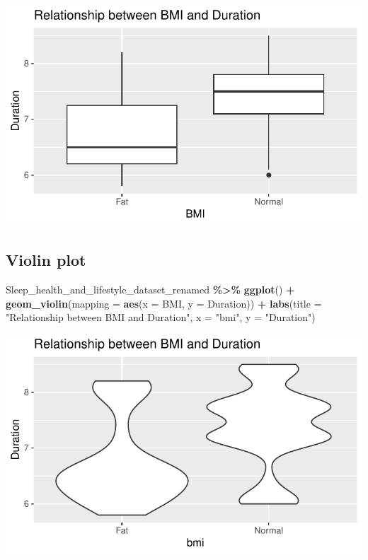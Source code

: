 \documentclass[
  11pt,
]{article}
\newenvironment{Shaded}{\begin{snugshade}}{\end{snugshade}}
\newcommand{\AttributeTok}[1]{\textcolor[rgb]{0.13,0.29,0.53}{#1}}
\newcommand{\FunctionTok}[1]{\textcolor[rgb]{0.13,0.29,0.53}{\textbf{#1}}}
\newcommand{\NormalTok}[1]{#1}
\newcommand{\SpecialCharTok}[1]{\textcolor[rgb]{0.81,0.36,0.00}{\textbf{#1}}}
\newcommand{\StringTok}[1]{\textcolor[rgb]{0.31,0.60,0.02}{#1}}
\begin{document}
\begin{center}\includegraphics[width=0.7\linewidth]{SleepHelath_files/figure-latex/unnamed-chunk-44-1} \end{center}

\hypertarget{violin-plot-1}{%
\subsection{Violin plot}\label{violin-plot-1}}

\begin{Shaded}
\begin{Highlighting}[]
\NormalTok{Sleep\_health\_and\_lifestyle\_dataset\_renamed }\SpecialCharTok{\%\textgreater{}\%}
  \FunctionTok{ggplot}\NormalTok{() }\SpecialCharTok{+}
    \FunctionTok{geom\_violin}\NormalTok{(}\AttributeTok{mapping =} \FunctionTok{aes}\NormalTok{(}\AttributeTok{x =}\NormalTok{ BMI, }\AttributeTok{y =}\NormalTok{ Duration)) }\SpecialCharTok{+}
    \FunctionTok{labs}\NormalTok{(}\AttributeTok{title =} \StringTok{"Relationship between BMI and Duration"}\NormalTok{, }\AttributeTok{x =} \StringTok{"bmi"}\NormalTok{, }\AttributeTok{y =} \StringTok{"Duration"}\NormalTok{)}
\end{Highlighting}
\end{Shaded}

\begin{center}\includegraphics[width=0.7\linewidth]{SleepHelath_files/figure-latex/unnamed-chunk-45-1} \end{center}
\end{document}
